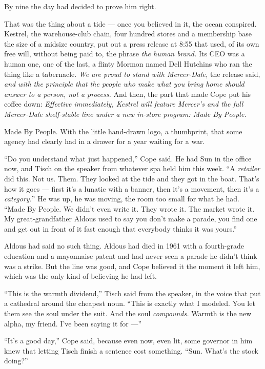 \documentclass[11pt,openany]{book}
\newcommand{\scenebreak}{\par\vspace{0.5\baselineskip}\begin{center}\textasteriskcentered\quad\textasteriskcentered\quad\textasteriskcentered\end{center}\vspace{0.5\baselineskip}\par}
\begin{document}
\scenebreak


By nine the day had decided to prove him right.

That was the thing about a tide --- once you believed in it, the ocean conspired. Kestrel, the warehouse-club chain, four hundred stores and a membership base the size of a midsize country, put out a press release at 8:55 that used, of its own free will, without being paid to, the phrase \textit{the human brand.} Its CEO was a human one, one of the last, a flinty Mormon named Dell Hutchins who ran the thing like a tabernacle. \textit{We are proud to stand with Mercer-Dale,} the release said, \textit{and with the principle that the people who make what you bring home should answer to a person, not a process.} And then, the part that made Cope put his coffee down: \textit{Effective immediately, Kestrel will feature Mercer's and the full Mercer-Dale shelf-stable line under a new in-store program: Made By People.}

Made By People. With the little hand-drawn logo, a thumbprint, that some agency had clearly had in a drawer for a year waiting for a war.

``Do you understand what just happened,'' Cope said. He had Sun in the office now, and Tisch on the speaker from whatever spa held him this week. ``A \textit{retailer} did this. Not us. Them. They looked at the tide and they got in the boat. That's how it goes --- first it's a lunatic with a banner, then it's a movement, then it's a \textit{category.}'' He was up, he was moving, the room too small for what he had. ``Made By People. We didn't even write it. They wrote it. The market wrote it. My great-grandfather Aldous used to say you don't make a parade, you find one and get out in front of it fast enough that everybody thinks it was yours.''

Aldous had said no such thing. Aldous had died in 1961 with a fourth-grade education and a mayonnaise patent and had never seen a parade he didn't think was a strike. But the line was good, and Cope believed it the moment it left him, which was the only kind of believing he had left.

``This is the warmth dividend,'' Tisch said from the speaker, in the voice that put a cathedral around the cheapest noun. ``This is exactly what I modeled. You let them see the soul under the suit. And the soul \textit{compounds.} Warmth is the new alpha, my friend. I've been saying it for ---''

``It's a good day,'' Cope said, because even now, even lit, some governor in him knew that letting Tisch finish a sentence cost something. ``Sun. What's the stock doing?''
\end{document}
